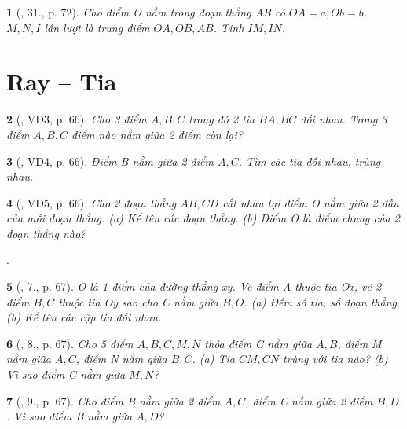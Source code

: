 \documentclass{article}
\newtheorem{baitoan}{}
\begin{document}
\begin{baitoan}[\cite{Binh_Toan_6_tap_2}, 31., p. 72]
	Cho điểm O nằm trong đoạn thẳng AB có $OA = a,Ob = b$. $M,N,I$ lần lượt là trung điểm $OA,OB,AB$. Tính $IM,IN$.
\end{baitoan}


\section{Ray -- Tia}

\begin{baitoan}[\cite{Binh_Toan_6_tap_2}, VD3, p. 66]
	Cho 3 điểm $A,B,C$ trong đó 2 tia $BA,BC$ đối nhau. Trong 3 điểm $A,B,C$ điểm nào nằm giữa 2 điểm còn lại?
\end{baitoan}

\begin{baitoan}[\cite{Binh_Toan_6_tap_2}, VD4, p. 66]
	Điểm B nằm giữa 2 điểm $A,C$. Tìm các tia đối nhau, trùng nhau.
\end{baitoan}

\begin{baitoan}[\cite{Binh_Toan_6_tap_2}, VD5, p. 66]
	Cho 2 đoạn thẳng $AB,CD$ cắt nhau tại điểm O nằm giữa 2 đầu của mỗi đoạn thẳng. (a) Kể tên các đoạn thẳng. (b) Điểm O là điểm chung của 2 đoạn thẳng nào?
\end{baitoan}
\noindent\cite[VD6, p. 66, 14., p. 68]{Binh_Toan_6_tap_2}.

\begin{baitoan}[\cite{Binh_Toan_6_tap_2}, 7., p. 67]
	O là 1 điểm của đường thẳng xy. Vẽ điểm A thuộc tia Ox, vẽ 2 điểm $B,C$ thuộc tia Oy sao cho C nằm giữa $B,O$. (a) Đếm số tia, số đoạn thẳng. (b) Kể tên các cặp tia đối nhau.
\end{baitoan}

\begin{baitoan}[\cite{Binh_Toan_6_tap_2}, 8., p. 67]
	Cho 5 điểm $A,B,C,M,N$ thỏa điểm C nằm giữa $A,B$, điểm M nằm giữa $A,C$, điểm N nằm giữa $B,C$. (a) Tia $CM,CN$ trùng với tia nào? (b) Vì sao điểm C nằm giữa $M,N$?
\end{baitoan}

\begin{baitoan}[\cite{Binh_Toan_6_tap_2}, 9., p. 67]
	Cho điểm B nằm giữa 2 điểm $A,C$, điểm C nằm giữa 2 điểm $B,D$. Vì sao điểm B nằm giữa $A,D$?
\end{baitoan}
\end{document}
